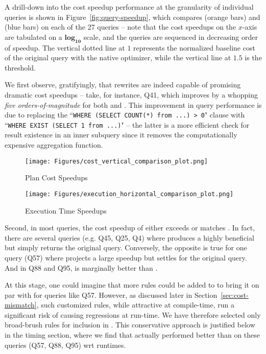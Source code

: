 A drill-down into the cost speedup performance at the granularity of individual queries is shown in Figure~\ref{fig:query-speedup}, which compares \lithe (orange bars) and \sota (blue bars) on each of the 27 \cpr queries  -- note that the cost speedups on the $x$-axis are tabulated on a $\mathbf{log_{10}}$ scale, and the queries are sequenced in decreasing order of \lithe speedup. The vertical dotted line at $1$ represents the normalized baseline cost of the original query with the native optimizer, while the vertical line at $1.5$ is the \cpr threshold.

We first observe, gratifyingly, that rewrites are indeed capable of promising dramatic cost speedups -- take, for instance, Q41, which improves by a whopping \emph{five orders-of-magnitude} for both \sota and \lithe. This improvement in query performance is due to replacing the ``\texttt{WHERE (SELECT COUNT(*) from ...) > 0}" clause with ``\texttt{WHERE EXIST (SELECT 1 from ...)}" -- the latter is a more efficient check for result existence in an inner subquery since it removes the computationally expensive aggregation function.
%

\begin{figure}[t]
  \begin{minipage}[t]{.49\textwidth}
    \texttt{[image: Figures/cost\_vertical\_comparison\_plot.png]}
    \caption{Plan Cost Speedups}
    \label{fig:query-speedup}
  \end{minipage}
  \hfill
  \begin{minipage}[t]{.49\textwidth}
    \texttt{[image: Figures/execution\_horizontal\_comparison\_plot.png]}
    \caption{Execution Time Speedups}
    \label{fig:execution-time}
  \end{minipage}
\end{figure}

Second, in most queries, the cost speedup of \lithe either exceeds or matches \sota. In fact, there are several queries (e.g. Q45, Q25, Q4) where \lithe produces a highly beneficial \cpr but \sota simply returns the original query. 
Conversely, the opposite is true for one query (Q57) where \sota projects a large speedup but \lithe settles for the original query.  And in Q88 and Q95, \sota is marginally better than \lithe.

At this stage, one could imagine that more rules could be added to \lithe to bring it on par with \sota for queries like Q57. However, as discussed later in Section~\ref{sec:cost-mismatch},  
such customized rules, while attractive at compile-time, run a significant risk of causing regressions at run-time.  We have therefore selected only broad-brush rules for inclusion in \lithe. This conservative approach is justified below in the timing section, where we find that \lithe actually performed better than \sota on these queries (Q57, Q88, Q95) wrt runtimes.



